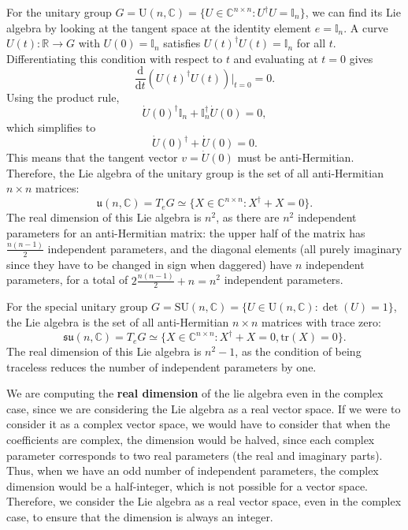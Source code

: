 \begin{example}
    For the unitary group \(G = \mathrm{U}(n, \mathbb{C}) = \{U \in \mathbb{C}^{n \times n} : U^\dagger U = \mathbb{I}_n\}\), we can find its Lie algebra by looking at the tangent space at the identity element \(e = \mathbb{I}_n\). A curve \(U(t) : \mathbb{R} \to G\) with \(U(0) = \mathbb{I}_n\) satisfies \(U(t)^\dagger U(t) = \mathbb{I}_n\) for all \(t\). Differentiating this condition with respect to \(t\) and evaluating at \(t = 0\) gives
    \[
        \frac{\mathrm{d}}{\mathrm{d} t} (U(t)^\dagger U(t)) \bigg|_{t=0} = 0.
    \]
    Using the product rule,
    \[
        \dot{U}(0)^\dagger \mathbb{I}_n + \mathbb{I}_n^\dagger \dot{U}(0) = 0,
    \]
    which simplifies to
    \[
        \dot{U}(0)^\dagger + \dot{U}(0) = 0.
    \]
    This means that the tangent vector \(v = \dot{U}(0)\) must be anti-Hermitian. Therefore, the Lie algebra of the unitary group is the set of all anti-Hermitian \(n \times n\) matrices:
    \[
        \mathfrak{u}(n, \mathbb{C}) = T_e G \simeq \{X \in \mathbb{C}^{n \times n} : X^\dagger + X = 0\}.
    \]
    The real dimension of this Lie algebra is \(n^2\), as there are \(n^2\) independent parameters for an anti-Hermitian matrix: the upper half of the matrix has \(\frac{n(n-1)}{2}\) independent parameters, and the diagonal elements (all purely imaginary since they have to be changed in sign when daggered) have \(n\) independent parameters, for a total of \(2 \frac{n(n-1)}{2} + n = n^2\) independent parameters.
\end{example}

\begin{example}
    For the special unitary group \(G = \mathrm{SU}(n, \mathbb{C}) = \{U \in \mathrm{U}(n, \mathbb{C}) : \det(U) = 1\}\), the Lie algebra is the set of all anti-Hermitian \(n \times n\) matrices with trace zero:
    \[
        \mathfrak{su}(n, \mathbb{C}) = T_e G \simeq \{X \in \mathbb{C}^{n \times n} : X^\dagger + X = 0, \mathrm{tr}(X) = 0\}.
    \]
    The real dimension of this Lie algebra is \(n^2 - 1\), as the condition of being traceless reduces the number of independent parameters by one.
\end{example}

We are computing the \textbf{real dimension} of the lie algebra even in the complex case, since we are considering the Lie algebra as a real vector space. If we were to consider it as a complex vector space, we would have to consider that when the coefficients are complex, the dimension would be halved, since each complex parameter corresponds to two real parameters (the real and imaginary parts). Thus, when we have an odd number of independent parameters, the complex dimension would be a half-integer, which is not possible for a vector space. Therefore, we consider the Lie algebra as a real vector space, even in the complex case, to ensure that the dimension is always an integer.

